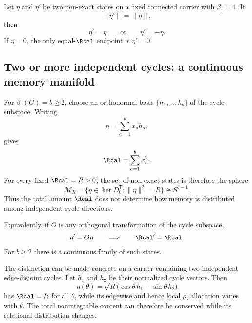 \begin{proposition}[Rigidity of source-free endpoints for $\beta_1=1$]
\label{prop:beta1-sourcefree-rigidity}
Let $\eta$ and $\eta'$ be two non-exact states on a fixed connected carrier with $\beta_1=1$. If
\begin{equation}
\lVert\eta'\rVert=\lVert\eta\rVert,
\end{equation}
then
\begin{equation}
\eta'=\eta
\qquad\text{or}\qquad
\eta'=-\eta.
\label{eq:beta1-rigidity}
\end{equation}
If $\eta=0$, the only equal-$\Rcal$ endpoint is $\eta'=0$.
\end{proposition}

\subsection{Two or more independent cycles: a continuous memory manifold}

For $\beta_1(G)=b\ge2$, choose an orthonormal basis $\{h_1,\ldots,h_b\}$ of the cycle subspace. Writing
\begin{equation}
\eta=\sum_{a=1}^{b}x_a h_a,
\end{equation}
gives
\begin{equation}
\Rcal=\sum_{a=1}^{b}x_a^2.
\end{equation}
For every fixed $\Rcal=R>0$, the set of non-exact states is therefore the sphere
\begin{equation}
\mathcal M_R
=
\{\eta\in\ker D_0^{\mathsf T}:\lVert\eta\rVert^2=R\}
\cong S^{b-1}.
\label{eq:memory-sphere}
\end{equation}
Thus the total amount $\Rcal$ does not determine how memory is distributed among independent cycle directions.

Equivalently, if $O$ is any orthogonal transformation of the cycle subspace,
\begin{equation}
\eta' = O\eta
\qquad\Longrightarrow\qquad
\Rcal'=\Rcal.
\label{eq:orthogonal-memory}
\end{equation}
For $b\ge2$ there is a continuous family of such states.

The distinction can be made concrete on a carrier containing two independent edge-disjoint cycles. Let $h_1$ and $h_2$ be their normalized cycle vectors. Then
\begin{equation}
\eta(\theta)=\sqrt{R}\bigl(\cos\theta\,h_1+\sin\theta\,h_2\bigr)
\label{eq:two-cycle-rotation}
\end{equation}
has $\Rcal=R$ for all $\theta$, while its edgewise and hence local $\rho_i$ allocation varies with $\theta$. The total nonintegrable content can therefore be conserved while its relational distribution changes.

